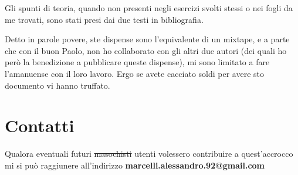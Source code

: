 Gli spunti di teoria, quando non presenti negli esercizi svolti stessi o nei fogli da me trovati, sono stati presi dai due testi in bibliografia. 

Detto in parole povere, ste dispense sono l'equivalente di un mixtape, e a parte che con il buon Paolo, non ho collaborato con gli altri due autori (dei quali ho però la benedizione a pubblicare queste dispense), mi sono limitato a fare l'amanuense con il loro lavoro. Ergo se avete cacciato soldi per avere sto documento vi hanno truffato.


\section{Contatti}

Qualora eventuali futuri \st{masochisti} utenti volessero contribuire a quest'accrocco mi si può raggiunere all'indirizzo \textbf{marcelli.alessandro.92@gmail.com}


